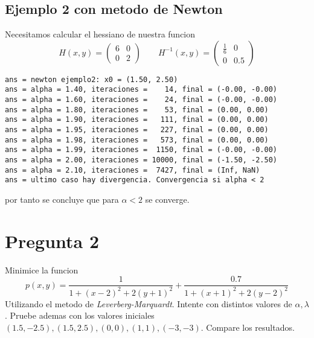 \documentclass[letterpaper]{article}
\begin{document}
\subsection*{Ejemplo 2 con metodo de Newton}
\noindent Necesitamos calcular el hessiano de nuestra funcion
\[ H(x,y) =
  \begin{pmatrix}
    6 & 0 \\
    0 & 2
  \end{pmatrix}
  \qquad
  H^{-1}(x,y) =
  \begin{pmatrix}
    \frac{1}{6} & 0 \\
    0 & 0.5
  \end{pmatrix}
\]
\begin{verbatim}
ans = newton ejemplo2: x0 = (1.50, 2.50)
ans = alpha = 1.40, iteraciones =    14, final = (-0.00, -0.00)
ans = alpha = 1.60, iteraciones =    24, final = (-0.00, -0.00)
ans = alpha = 1.80, iteraciones =    53, final = (0.00, 0.00)
ans = alpha = 1.90, iteraciones =   111, final = (0.00, 0.00)
ans = alpha = 1.95, iteraciones =   227, final = (0.00, 0.00)
ans = alpha = 1.98, iteraciones =   573, final = (0.00, 0.00)
ans = alpha = 1.99, iteraciones =  1150, final = (-0.00, -0.00)
ans = alpha = 2.00, iteraciones = 10000, final = (-1.50, -2.50)
ans = alpha = 2.10, iteraciones =  7427, final = (Inf, NaN)
ans = ultimo caso hay divergencia. Convergencia si alpha < 2
\end{verbatim}
por tanto se concluye que para \(\alpha < 2\) se converge.

\section*{Pregunta 2}
\noindent Minimice la funcion
\[ p(x,y) = \frac{1}{1 + (x-2)^2 + 2 (y+1)^2} + \frac{0.7}{1 + (x+1)^2 +
    2 (y - 2)^2 } \]
Utilizando el metodo de \emph{Leverberg-Marquardt}. Intente con distintos
valores de \(\alpha, \lambda\). Pruebe ademas con los valores iniciales
\((1.5, -2.5), (1.5, 2.5), (0,0), (1,1), (-3,-3)\). Compare los resultados.
\end{document}
